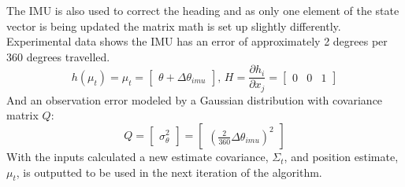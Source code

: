 \documentclass[main.tex]{subfiles}
\begin{document}
The IMU is also used to correct the heading and as only one element of the state vector is being updated the matrix math is set up slightly differently. Experimental data shows the IMU has an error of approximately 2 degrees per 360 degrees travelled. 
\[
h(\mu_t) = \mu_t = 
\begin{bmatrix}
    \theta + \Delta \theta_{imu}
\end{bmatrix}
\textrm{, } H = \frac{\partial h_i}{\partial x_j} = 
\begin{bmatrix}
    0	&	0	&	1
\end{bmatrix}
\]
And an observation error modeled by a Gaussian distribution with covariance matrix $Q$:
\[
Q = 
\begin{bmatrix}
    \sigma_\theta^2
\end{bmatrix}
=
\begin{bmatrix}
    (\frac{2}{360}\Delta \theta_{imu})^2
\end{bmatrix}
\]
With the inputs calculated a new estimate covariance, $\Sigma_t$, and position estimate, $\mu_t$, is outputted to be used in the next iteration of the algorithm. 
\end{document}
